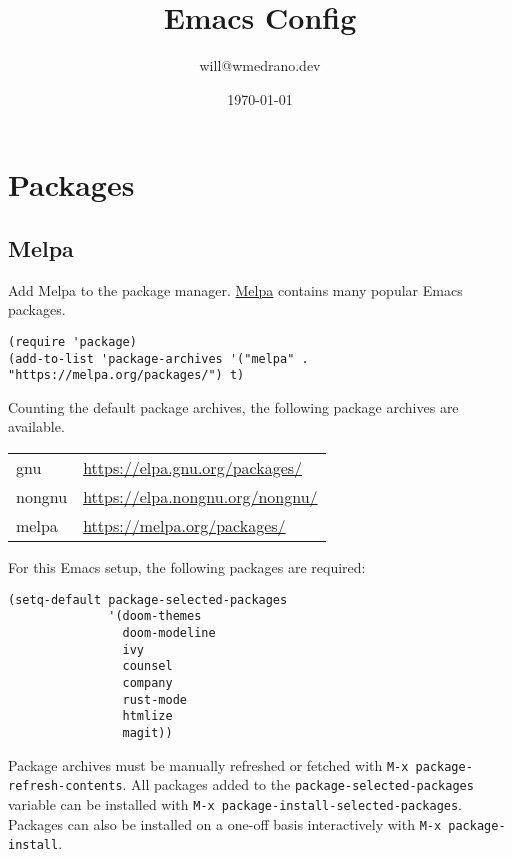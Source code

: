 \documentclass[11pt]{article}
\author{will@wmedrano.dev}
\date{\today}
\title{Emacs Config}
\begin{document}
\maketitle
\tableofcontents

\section{Packages}
\label{sec:orgab3f611}

\subsection{Melpa}
\label{sec:org7b57185}

Add Melpa to the package manager. \href{https://melpa.org}{Melpa} contains many popular Emacs packages.

\begin{verbatim}
(require 'package)
(add-to-list 'package-archives '("melpa" . "https://melpa.org/packages/") t)
\end{verbatim}

Counting the default package archives, the following package archives are
available.

\begin{center}
\begin{tabular}{ll}
gnu & \url{https://elpa.gnu.org/packages/}\\
nongnu & \url{https://elpa.nongnu.org/nongnu/}\\
melpa & \url{https://melpa.org/packages/}\\
\end{tabular}
\end{center}

For this Emacs setup, the following packages are required:

\begin{verbatim}
(setq-default package-selected-packages
              '(doom-themes
                doom-modeline
                ivy
                counsel
                company
                rust-mode
                htmlize
                magit))
\end{verbatim}

Package archives must be manually refreshed or fetched with \texttt{M-x
package-refresh-contents}. All packages added to the \texttt{package-selected-packages}
variable can be installed with \texttt{M-x package-install-selected-packages}. Packages
can also be installed on a one-off basis interactively with \texttt{M-x
package-install}.
\end{document}
